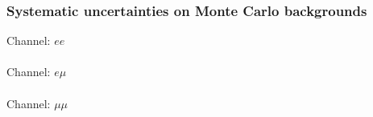 \subsubsection{Systematic uncertainties on Monte Carlo backgrounds}
\begin{centering}
\tiny
Channel: $ee$ \\

\\
Channel: $e \mu$ \\

\\
Channel: $\mu \mu$ \\

\\
\label{tab:systematicsBG}
\end{centering}

